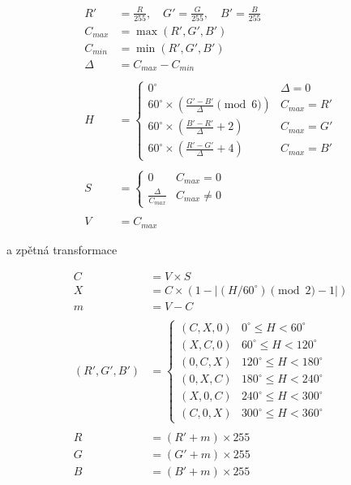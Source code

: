 \[
\begin{aligned}
R' &= \frac{R}{255}, \quad G' = \frac{G}{255}, \quad B' = \frac{B}{255} \\
C_{max} &= \max(R', G', B') \\
C_{min} &= \min(R', G', B') \\
\Delta &= C_{max} - C_{min} \\
\\
H &= \begin{cases} 
0^\circ & \Delta = 0 \\
60^\circ \times \left(\frac{G' - B'}{\Delta} \pmod 6\right) & C_{max} = R' \\
60^\circ \times \left(\frac{B' - R'}{\Delta} + 2\right) & C_{max} = G' \\
60^\circ \times \left(\frac{R' - G'}{\Delta} + 4\right) & C_{max} = B'
\end{cases} \\
\\
S &= \begin{cases} 
0 & C_{max} = 0 \\
\frac{\Delta}{C_{max}} & C_{max} \neq 0 
\end{cases} \\
\\
V &= C_{max}
\end{aligned}
\]



a zpětná transformace 

\[\begin{aligned}
C &= V \times S \\
X &= C \times (1 - |(H / 60^\circ) \pmod 2 - 1|) \\
m &= V - C \\
\\
(R', G', B') &= \begin{cases} 
(C, X, 0) & 0^\circ \le H < 60^\circ \\
(X, C, 0) & 60^\circ \le H < 120^\circ \\
(0, C, X) & 120^\circ \le H < 180^\circ \\
(0, X, C) & 180^\circ \le H < 240^\circ \\
(X, 0, C) & 240^\circ \le H < 300^\circ \\
(C, 0, X) & 300^\circ \le H < 360^\circ
\end{cases} \\
\\
R &= (R' + m) \times 255 \\
G &= (G' + m) \times 255 \\
B &= (B' + m) \times 255 
\end{aligned}\]

